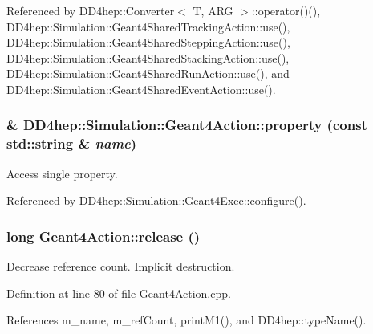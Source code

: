 Referenced by DD4hep::Converter$<$ T, ARG $>$::operator()(), DD4hep::Simulation::Geant4SharedTrackingAction::use(), DD4hep::Simulation::Geant4SharedSteppingAction::use(), DD4hep::Simulation::Geant4SharedStackingAction::use(), DD4hep::Simulation::Geant4SharedRunAction::use(), and DD4hep::Simulation::Geant4SharedEventAction::use().\hypertarget{class_d_d4hep_1_1_simulation_1_1_geant4_action_aa9797c4749e92c0611ca7ce6f8b7bc78}{
\subsubsection[{property}]{\& DD4hep::Simulation::Geant4Action::property (const std::string \& {\em name})}}
\label{class_d_d4hep_1_1_simulation_1_1_geant4_action_aa9797c4749e92c0611ca7ce6f8b7bc78}


Access single property. 

Referenced by DD4hep::Simulation::Geant4Exec::configure().\hypertarget{class_d_d4hep_1_1_simulation_1_1_geant4_action_a3afba3ee937fdbd25d27994e4e75c5ac}{
\subsubsection[{release}]{\setlength{\rightskip}{0pt plus 5cm}long Geant4Action::release ()}}
\label{class_d_d4hep_1_1_simulation_1_1_geant4_action_a3afba3ee937fdbd25d27994e4e75c5ac}


Decrease reference count. Implicit destruction. 

Definition at line 80 of file Geant4Action.cpp.

References m\_\-name, m\_\-refCount, printM1(), and DD4hep::typeName().

